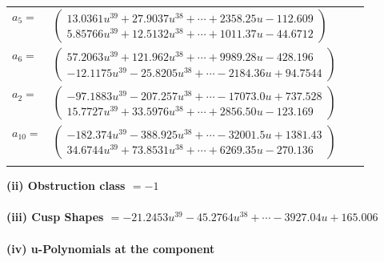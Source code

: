 \documentclass[1p]{elsarticle_modified}
\theoremstyle{definition}
\begin{document}
\begin{tabular}{m{7pt} m{180pt} m{7pt} m{180pt} }
\flushright $a_{5}=$&$\begin{pmatrix}13.0361 u^{39}+27.9037 u^{38}+\cdots+2358.25 u-112.609\\5.85766 u^{39}+12.5132 u^{38}+\cdots+1011.37 u-44.6712\end{pmatrix}$ \\
\flushright $a_{6}=$&$\begin{pmatrix}57.2063 u^{39}+121.962 u^{38}+\cdots+9989.28 u-428.196\\-12.1175 u^{39}-25.8205 u^{38}+\cdots-2184.36 u+94.7544\end{pmatrix}$ \\
\flushright $a_{2}=$&$\begin{pmatrix}-97.1883 u^{39}-207.257 u^{38}+\cdots-17073.0 u+737.528\\15.7727 u^{39}+33.5976 u^{38}+\cdots+2856.50 u-123.169\end{pmatrix}$ \\
\flushright $a_{10}=$&$\begin{pmatrix}-182.374 u^{39}-388.925 u^{38}+\cdots-32001.5 u+1381.43\\34.6744 u^{39}+73.8531 u^{38}+\cdots+6269.35 u-270.136\end{pmatrix}$\\&\end{tabular}
\flushleft \textbf{(ii) Obstruction class $= -1$}\\~\\
\flushleft \textbf{(iii) Cusp Shapes $= -21.2453 u^{39}-45.2764 u^{38}+\cdots-3927.04 u+165.006$}\\~\\
\newpage\renewcommand{\arraystretch}{1}
\flushleft \textbf{(iv) u-Polynomials at the component}\newline \\
\end{document}
